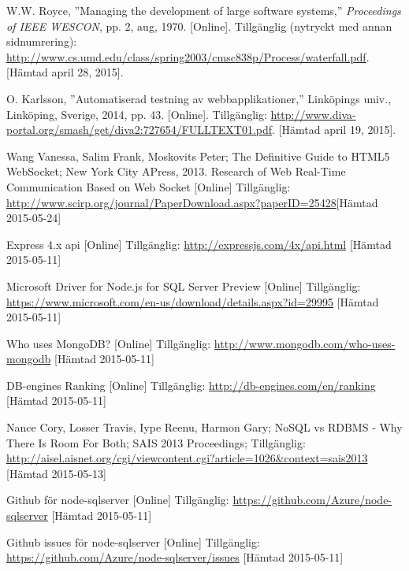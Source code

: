 \begin{thebibliography}{9}
W.W. Royce, ''Managing the development of large software systems,''
\textit{Proceedings of IEEE WESCON}, pp. 2, aug, 1970.
[Online].
Tillgänglig (nytryckt med annan sidnumrering):
\url{http://www.cs.umd.edu/class/spring2003/cmsc838p/Process/waterfall.pdf}.
[Hämtad april 28, 2015].

O. Karlsson, ''Automatiserad testning av webbapplikationer,''
Linköpings univ., Linköping, Sverige, 2014, pp. 43.
[Online]. 
Tillgänglig: 
\url{http://www.diva-portal.org/smash/get/diva2:727654/FULLTEXT01.pdf}.
[Hämtad april 19, 2015].

 Wang Vanessa, Salim Frank, Moskovits Peter; The Definitive Guide to HTML5 WebSocket; New York City APress, 2013.
Research of Web Real-Time Communication Based on Web Socket [Online] Tillgänglig:
\url{http://www.scirp.org/journal/PaperDownload.aspx?paperID=25428}[Hämtad 2015-05-24]


Express 4.x api [Online] Tillgänglig: 
\url{http://expressjs.com/4x/api.html} [Hämtad 2015-05-11]

Microsoft Driver for Node.js for SQL Server Preview [Online] Tillgänglig: 
\url{https://www.microsoft.com/en-us/download/details.aspx?id=29995} [Hämtad 2015-05-11]

Who uses MongoDB? [Online] Tillgänglig: 
\url{http://www.mongodb.com/who-uses-mongodb} [Hämtad 2015-05-11]

DB-engines Ranking [Online] Tillgänglig: 
\url{http://db-engines.com/en/ranking} [Hämtad 2015-05-11]

 Nance Cory, Losser Travis, Iype Reenu, Harmon Gary; NoSQL vs RDBMS - Why There Is Room For Both; SAIS 2013 Proceedings; Tillgänglig: 
\url{http://aisel.aisnet.org/cgi/viewcontent.cgi?article=1026&context=sais2013} [Hämtad 2015-05-13]

Github för node-sqlserver [Online] Tillgänglig:  
\url{https://github.com/Azure/node-sqlserver} [Hämtad 2015-05-11]

Github issues för node-sqlserver [Online] Tillgänglig: 
\url{https://github.com/Azure/node-sqlserver/issues} [Hämtad 2015-05-11]

\end{thebibliography}
